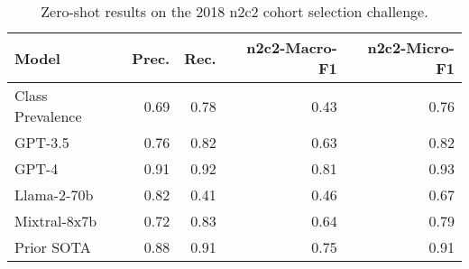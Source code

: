 \begin{table}
\caption{Zero-shot results on the 2018 n2c2 cohort selection challenge.}
\label{tab:base_llms}
\begin{tabular}{lrrrr}
\toprule
Model & Prec. & Rec. & n2c2-Macro-F1 & n2c2-Micro-F1 \\
\midrule
Class Prevalence & 0.69 & 0.78 & 0.43 & 0.76 \\
GPT-3.5 & 0.76 & 0.82 & 0.63 & 0.82 \\
GPT-4 & 0.91 & 0.92 & 0.81 & 0.93 \\
Llama-2-70b & 0.82 & 0.41 & 0.46 & 0.67 \\
Mixtral-8x7b & 0.72 & 0.83 & 0.64 & 0.79 \\
Prior SOTA & 0.88 & 0.91 & 0.75 & 0.91 \\
\bottomrule
\end{tabular}
\end{table}
